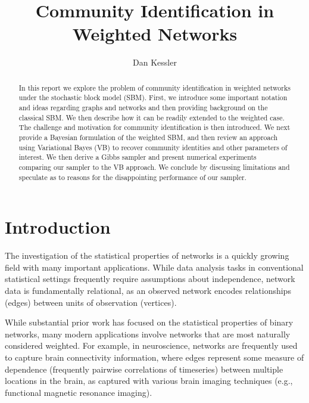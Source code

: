 \documentclass[12pt]{article}   %
\begin{document}


\title{Community Identification in Weighted Networks}
\author{Dan Kessler}

\maketitle

\begin{abstract}
  In this report we explore the problem of community identification in weighted networks under the stochastic block model (SBM).
  First, we introduce some important notation and ideas regarding graphs and networks and then providing background on the classical SBM.
  We then describe how it can be readily extended to the weighted case.
  The challenge and motivation for community identification is then introduced.
  We next provide a Bayesian formulation of the weighted SBM, and then review an approach using Variational Bayes (VB) to recover community identities and other parameters of interest.
  We then derive a Gibbs sampler and present numerical experiments comparing our sampler to the VB approach.
  We conclude by discussing limitations and speculate as to reasons for the disappointing performance of our sampler.
\end{abstract}

\section{Introduction}
\label{sec:introduction}

The investigation of the statistical properties of networks is a quickly growing field with many important applications.
While data analysis tasks in conventional statistical settings frequently require assumptions about independence, network data is fundamentally relational, as an observed network encodes relationships (edges) between units of observation (vertices).

While substantial prior work has focused on the statistical properties of binary networks, many modern applications involve networks that are most naturally considered weighted.
For example, in neuroscience, networks are frequently used to capture brain connectivity information, where edges represent some measure of dependence (frequently pairwise correlations of timeseries) between multiple locations in the brain, as captured with various brain imaging techniques (e.g., functional magnetic resonance imaging).
\end{document}
